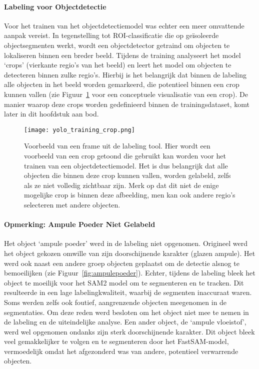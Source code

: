 \paragraph{Labeling voor Objectdetectie}
Voor het trainen van het objectdetectiemodel was echter een meer omvattende aanpak vereist.
In tegenstelling tot ROI-classificatie die op geïsoleerde objectsegmenten werkt, wordt een objectdetector 
getraind om objecten te lokaliseren binnen een breder beeld.
Tijdens de training analyseert het model `crops' (vierkante regio's van het beeld) en leert het model om objecten te detecteren binnen zulke regio's.
Hierbij is het belangrijk dat binnen de labeling alle objecten in het beeld worden gemarkeerd, die potentieel binnen een crop kunnen vallen
(zie Figuur~\ref{fig:voorbeeld_crop_yolo_training} voor een conceptuele visualisatie van een crop).
De manier waarop deze crops worden gedefinieerd binnen de trainingsdataset, komt later in dit hoofdstuk aan bod.

\begin{figure}[H]
    \centering
    \texttt{[image: yolo\_training\_crop.png]}
    \caption[Voorbeeld van een crop voor objectdetectie]{
        \label{fig:voorbeeld_crop_yolo_training}
        Voorbeeld van een frame uit de labeling tool. 
        Hier wordt een voorbeeld van een crop getoond die gebruikt kan worden voor het trainen van een objectdetectiemodel.
        Het is dus belangrijk dat alle objecten die binnen deze crop kunnen vallen,
        worden gelabeld, zelfs als ze niet volledig zichtbaar zijn.
        Merk op dat dit niet de enige mogelijke crop is binnen deze afbeelding, men kan ook andere regio's selecteren met andere objecten.
    }
\end{figure}

\paragraph{Opmerking: Ampule Poeder Niet Gelabeld}
Het object `ampule poeder' werd in de labeling niet opgenomen. 
Origineel werd het object gekozen omwille van zijn doorschijnende karakter (glazen ampule).
Het werd ook naast een andere groep objecten geplaatst om de detectie alsnog te bemoeilijken (zie Figuur~\ref{fig:ampulepoeder}).
Echter, tijdens de labeling bleek het object te moeilijk voor het SAM2 model om te segmenteren en te tracken.
Dit resulteerde in een lage labelingkwaliteit, waarbij de segmenten inaccuraat waren.
Soms werden zelfs ook foutief, aangrenzende objecten meegenomen in de segmentaties.
Om deze reden werd besloten om het object niet mee te nemen in de labeling en de uiteindelijke analyse. 
Een ander object, de `ampule vloeistof', werd wel opgenomen ondanks zijn sterk doorschijnende karakter.
Dit object bleek veel gemakkelijker te volgen en te segmenteren door het FastSAM-model, vermoedelijk omdat het afgezonderd was van andere, 
potentieel verwarrende objecten.

